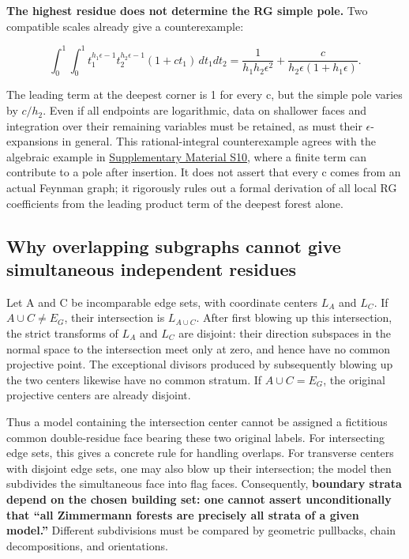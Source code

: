 \documentclass[11pt,a4paper,oneside]{article}
\theoremstyle{plain}
\theoremstyle{definition}
\theoremstyle{remark}
\numberwithin{equation}{section}
\newcommand{\otherref}[2]{\href{#1.pdf}{#2}}
\begin{document}
\textbf{The highest residue does not determine the RG simple pole.} Two compatible scales already give a counterexample:

\begin{equation}
\int_0^1\!\int_0^1
 t_1^{h_1\epsilon-1}t_2^{h_2\epsilon-1}(1+c t_1)\,dt_1dt_2
 =\frac1{h_1h_2\epsilon^2}
                  +\frac{c}{h_2\epsilon(1+h_1\epsilon)}.         \label{eq:contraction:25a}
\end{equation}

The leading term at the deepest corner is 1 for every c, but the simple pole varies by \(c/h_2\). Even if all endpoints are logarithmic, data on shallower faces and integration over their remaining variables must be retained, as must their \(\epsilon \)-expansions in general. This rational-integral counterexample agrees with the algebraic example in \otherref{feynman_periods_supplement_en}{Supplementary Material S10}, where a finite term can contribute to a pole after insertion. It does not assert that every c comes from an actual Feynman graph; it rigorously rules out a formal derivation of all local RG coefficients from the leading product term of the deepest forest alone.


\subsection{Why overlapping subgraphs cannot give simultaneous independent residues}\label{sec:contraction:7}

Let A and C be incomparable edge sets, with coordinate centers \(L_A\) and \(L_C\). If \(A\cup C\ne E_G\), their intersection is \(L_{A\cup C}\). After first blowing up this intersection, the strict transforms of \(L_A\) and \(L_C\) are disjoint: their direction subspaces in the normal space to the intersection meet only at zero, and hence have no common projective point. The exceptional divisors produced by subsequently blowing up the two centers likewise have no common stratum. If \(A\cup C=E_G\), the original projective centers are already disjoint.

Thus a model containing the intersection center cannot be assigned a fictitious common double-residue face bearing these two original labels. For intersecting edge sets, this gives a concrete rule for handling overlaps. For transverse centers with disjoint edge sets, one may also blow up their intersection; the model then subdivides the simultaneous face into flag faces. Consequently, \textbf{boundary strata depend on the chosen building set: one cannot assert unconditionally that ``all Zimmermann forests are precisely all strata of a given model.''} Different subdivisions must be compared by geometric pullbacks, chain decompositions, and orientations.
\end{document}
